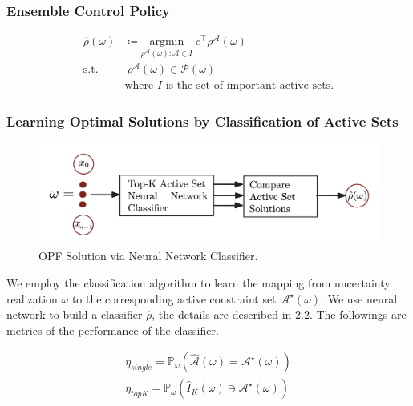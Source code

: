 \documentclass[11pt]{article}
\begin{document}
\subsubsection{Ensemble Control Policy}
\begin{align}\label{eq:opf_predict}
\hat{\rho}\left(\omega\right) & \coloneqq \underset{\rho^{\mathcal{A}}\left(\omega\right):\mathcal{A}\in I}{\mathrm{argmin}} \; c^{\top}\rho^{\mathcal{A}}\left(\omega\right) \\
\textrm{s.t.} 
~ &~ \rho^{\mathcal{A}}\left(\omega\right) \in \mathcal{P}\left(\omega\right) \nonumber \\
& \text{where } I \text{ is the set of important active sets.} \nonumber
\end{align}

\subsubsection{Learning Optimal Solutions by Classification of Active Sets}
\begin{figure}[h]\label{fig:opf_nns}
\centering
\includegraphics[scale=0.2]{report/figure/OPF NNs Classifier.png}
\caption{OPF Solution via Neural Network Classifier. \cite{10.1109/ptc.2019.8810819}}
\end{figure}
We employ the classification algorithm to learn the mapping from uncertainty realization $\omega$ to the corresponding active constraint set $\mathcal{A}^{\star}\left( \omega \right)$. We use neural network to build a classifier $\hat{\rho}$, the details are described in 2.2. The followings are metrics of the performance of the classifier.

\begin{align}\label{eq:acc}
\eta_{single} = \mathbb{P}_{\omega}\left(\hat{\mathcal{A}} \left(\omega \right)=\mathcal{A}^{\star}\left(\omega \right) \right) \\
\eta_{topK} = \mathbb{P}_{\omega}\left(\hat{I}_{K} \left(\omega \right) \ni \mathcal{A}^{\star}\left(\omega \right) \right)
\end{align}
\end{document}
